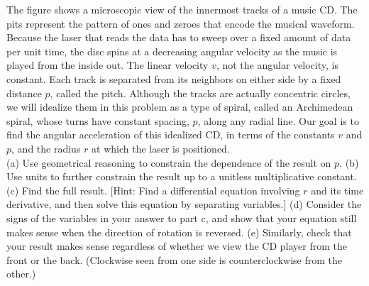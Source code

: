 The figure shows a microscopic view of the innermost tracks of a music CD.
The pits represent the pattern of ones and zeroes that encode the musical waveform.
Because the laser that reads the data has to sweep over a fixed amount of data
per unit time, the disc spins at a decreasing angular velocity as the music is
played from the inside out. The linear velocity $v$, not the angular velocity,
is constant. Each track is separated from its neighbors on either side by a fixed distance $p$, called
the pitch. Although the tracks are actually concentric circles, we will idealize
them in this problem as a type of spiral, called an Archimedean spiral,
whose turns have constant spacing, $p$, along any radial line.
Our goal is to find the angular acceleration of this idealized CD, in terms of the constants
$v$ and $p$, and the radius $r$ at which the laser is positioned.\\
(a) Use geometrical reasoning to constrain the dependence of the result on $p$.\hwendpart
(b) Use units to further constrain the result up to a unitless multiplicative constant.\hwendpart
(c) Find the full result. [Hint: Find a differential equation involving $r$ and its time derivative,
and then solve this equation by separating variables.]\answercheck\hwendpart
(d) Consider the signs of the variables in your answer to part c, and show that
your equation still makes sense when the direction of rotation is reversed.\hwendpart
(e) Similarly, check that your result makes sense regardless of whether we view the
CD player from the front or the back. (Clockwise seen from one side is counterclockwise
from the other.)

